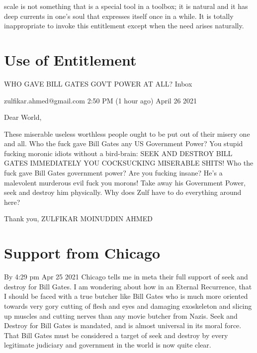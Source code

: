 \documentclass{amsart}
\begin{document}
scale is not something that is a special tool in a toolbox; it is natural and it has deep currents in one's soul that expresses itself once in a while.  It is totally inappropriate to invoke this entitlement except when the need arises naturally.

\section{Use of Entitlement}

WHO GAVE BILL GATES GOVT POWER AT ALL?
Inbox

zulfikar.ahmed@gmail.com 2:50 PM (1 hour ago) April 26 2021


Dear World,

These miserable useless worthless people ought to be put out of their misery one and all.  Who the fuck gave Bill Gates any US Government Power?  You stupid fucking moronic idiots without a bird-brain: SEEK AND DESTROY BILL GATES IMMEDIATELY YOU COCKSUCKING MISERABLE SHITS!  Who the fuck gave Bill Gates government power?  Are you fucking insane?  He's a malevolent murderous evil fuck you morons!  Take away his Government Power, seek and destroy him physically.  Why does Zulf have to do everything around here?

Thank you,
ZULFIKAR MOINUDDIN AHMED

\section{Support from Chicago}

By 4:29 pm Apr 25 2021 Chicago tells me in meta their full support of seek and destroy for Bill Gates.  I am wondering about how in an Eternal Recurrence, that I should be faced with a true butcher like Bill Gates who is much more oriented towards very gory cutting of flesh and eyes and damaging exoskeleton and slicing up muscles and cutting nerves than any movie butcher from Nazis.  Seek and Destroy for Bill Gates is mandated, and is almost universal in its moral force.  That Bill Gates must be considered a target of seek and destroy by every legitimate judiciary and government in the world is now quite clear.  
\end{document}
